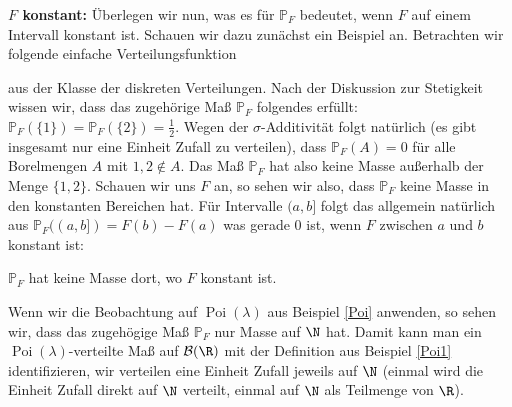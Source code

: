 \begin{disc}
\textbf{$F$ konstant:} \"Uberlegen wir nun, was es f\"ur $\mathbb P_F$ bedeutet, wenn $F$ auf einem Intervall konstant ist. Schauen wir dazu zun\"achst ein Beispiel an. Betrachten wir folgende einfache Verteilungsfunktion
\begin{center}	
\end{center}
	aus der Klasse der diskreten Verteilungen. Nach der Diskussion zur Stetigkeit wissen wir, dass das zugeh\"orige Ma\ss{} $\mathbb P_F$ folgendes erf\"ullt: $\mathbb P_F(\{1\})=	\mathbb P_F(\{2\})=\frac{1}{2}.$ Wegen der $\sigma$-Additivit\"at folgt nat\"urlich (es gibt insgesamt nur eine Einheit Zufall zu verteilen), dass $\mathbb P_F(A)=0$ f\"ur alle Borelmengen $A$ mit $1,2\notin A$. Das Ma\ss{} $\mathbb P_F$ hat also keine Masse au\ss erhalb der Menge $\{1,2\}$. Schauen wir uns $F$ an, so sehen wir also, dass $\mathbb P_F$ keine Masse in den konstanten Bereichen hat. F\"ur Intervalle $(a,b]$ folgt das allgemein nat\"urlich aus $\mathbb P_F((a,b])=F(b)-F(a)$ was gerade $0$ ist, wenn $F$ zwischen $a$ und $b$ konstant ist:
	\begin{center}
		\glqq $\mathbb{P}_F$ hat keine Masse dort, wo $F$ konstant ist.\grqq
	\end{center}

	Wenn wir die Beobachtung auf $\operatorname{Poi}(\lambda)$ aus Beispiel \ref{Poi} anwenden, so sehen wir, dass das zugeh\"ogige Ma\ss{} $\mathbb P_F$ nur Masse auf $\N$ hat. Damit kann man ein $\operatorname{Poi}(\lambda)$-verteilte Ma\ss{} auf $\mathcal B(\R)$ mit der Definition aus Beispiel \ref{Poi1} identifizieren, wir verteilen eine Einheit Zufall jeweils auf $\N$ (einmal wird die Einheit Zufall direkt auf $\N$ verteilt, einmal auf $\N$ als Teilmenge von $\R$).
	

\end{disc}
